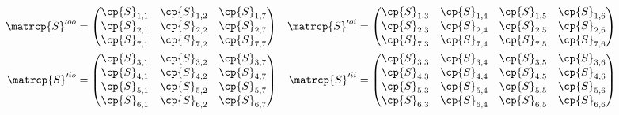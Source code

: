 \begin{equation}
    \begin{aligned}
    \matrcp{S}'^{oo}
    &=
    \begin{pmatrix}
        \cp{S}_{1,1} & \cp{S}_{1,2} & \cp{S}_{1,7} \\
        \cp{S}_{2,1} & \cp{S}_{2,2} & \cp{S}_{2,7} \\
        \cp{S}_{7,1} & \cp{S}_{7,2} & \cp{S}_{7,7} \\
    \end{pmatrix}
    &
    \matrcp{S}'^{oi}
    &=
    \begin{pmatrix}
        \cp{S}_{1,3} & \cp{S}_{1,4} & \cp{S}_{1,5} & \cp{S}_{1,6} \\
        \cp{S}_{2,3} & \cp{S}_{2,4} & \cp{S}_{2,5} & \cp{S}_{2,6} \\
        \cp{S}_{7,3} & \cp{S}_{7,4} & \cp{S}_{7,5} & \cp{S}_{7,6} \\
    \end{pmatrix}
    \\
    \matrcp{S}'^{io}
    &=
    \begin{pmatrix}
        \cp{S}_{3,1} & \cp{S}_{3,2} & \cp{S}_{3,7} \\
        \cp{S}_{4,1} & \cp{S}_{4,2} & \cp{S}_{4,7} \\
        \cp{S}_{5,1} & \cp{S}_{5,2} & \cp{S}_{5,7} \\
        \cp{S}_{6,1} & \cp{S}_{6,2} & \cp{S}_{6,7} \\
    \end{pmatrix}
    &
    \matrcp{S}'^{ii}
    &=
    \begin{pmatrix}
        \cp{S}_{3,3} & \cp{S}_{3,4} & \cp{S}_{3,5} & \cp{S}_{3,6} \\
        \cp{S}_{4,3} & \cp{S}_{4,4} & \cp{S}_{4,5} & \cp{S}_{4,6} \\
        \cp{S}_{5,3} & \cp{S}_{5,4} & \cp{S}_{5,5} & \cp{S}_{5,6} \\
        \cp{S}_{6,3} & \cp{S}_{6,4} & \cp{S}_{6,5} & \cp{S}_{6,6} \\
    \end{pmatrix}
    \end{aligned}
    \label{eq:q_s_qtranspose_sprime_decomposed}
\end{equation}
